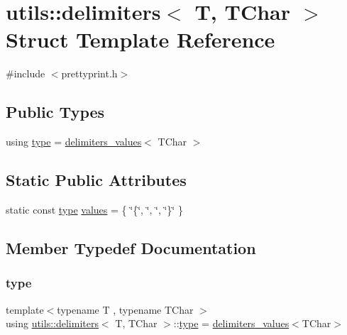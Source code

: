 \hypertarget{structutils_1_1delimiters}{}\section{utils\+::delimiters$<$ T, T\+Char $>$ Struct Template Reference}
\label{structutils_1_1delimiters}


{\ttfamily \#include $<$prettyprint.\+h$>$}

\subsection*{Public Types}
\begin{DoxyCompactItemize}
\item 
using \mbox{\hyperlink{structutils_1_1delimiters_ab4062ec84eb36f86b334446a538961c3}{type}} = \mbox{\hyperlink{structutils_1_1delimiters__values}{delimiters\+\_\+values}}$<$ T\+Char $>$
\end{DoxyCompactItemize}
\subsection*{Static Public Attributes}
\begin{DoxyCompactItemize}
\item 
static const \mbox{\hyperlink{structutils_1_1delimiters_ab4062ec84eb36f86b334446a538961c3}{type}} \mbox{\hyperlink{structutils_1_1delimiters_ab9b423d2597b66a5c1866f3b820f8a46}{values}} = \{ \char`\"{}\{\char`\"{}, \char`\"{}, \char`\"{}, \char`\"{}\}\char`\"{} \}
\end{DoxyCompactItemize}


\subsection{Member Typedef Documentation}
\mbox{\label{structutils_1_1delimiters_ab4062ec84eb36f86b334446a538961c3}} 
\subsubsection{\texorpdfstring{type}{type}}
{\footnotesize\ttfamily template$<$typename T , typename T\+Char $>$ \\
using \mbox{\hyperlink{structutils_1_1delimiters}{utils\+::delimiters}}$<$ T, T\+Char $>$\+::\mbox{\hyperlink{structutils_1_1delimiters_ab4062ec84eb36f86b334446a538961c3}{type}} =  \mbox{\hyperlink{structutils_1_1delimiters__values}{delimiters\+\_\+values}}$<$T\+Char$>$}



